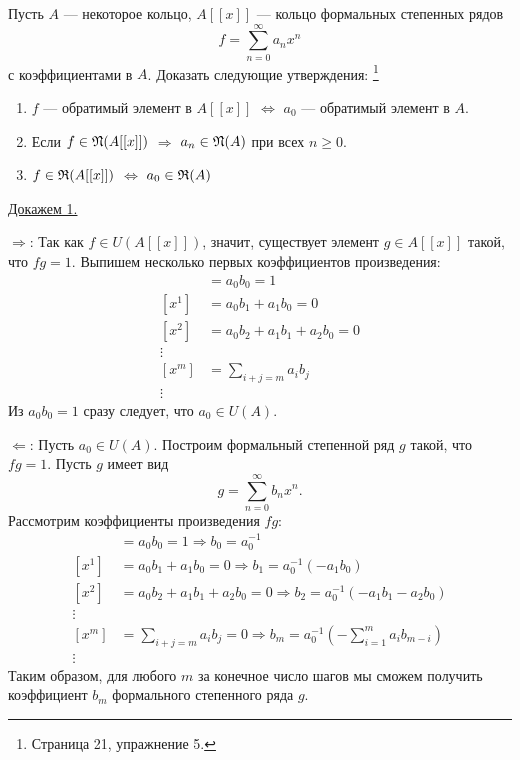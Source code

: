     \begin{Ex}
        Пусть $A$ --- некоторое кольцо, $A[[x]]$ --- кольцо формальных степенных рядов 
        $$
            f = \sum_{n=0}^\infty a_nx^n
        $$ 
        с коэффициентами в $A$. Доказать следующие 
        утверждения: \footnote{\cite{A-M} Страница 21, упражнение 5.}
        \begin{enumerate}
            \item $f$ --- обратимый элемент в $A[[x]]$ $\Leftrightarrow$ $a_0$ --- обратимый элемент в $A$.
            \item Если $f \in \mathfrak{N}(A[[x]])$ $\Rightarrow$ $a_n \in \mathfrak{N}(A)$ при всех $n \geqslant 0$.
            \item $f \in \mathfrak{R}(A[[x]])$ $\Leftrightarrow$ $a_0 \in \mathfrak{R}(A)$
        \end{enumerate}
    \end{Ex}
    \underline{Докажем 1.}
    \begin{Proof}
        
        $\Rightarrow$: Так как $f \in U(A[[x]])$, значит, существует элемент $g \in A[[x]]$ такой, что $fg = 1$. Выпишем несколько первых коэффициентов произведения:
        \begin{align*}
            [x^0] &= a_0b_0 = 1\\
            [x^1] &= a_0b_1 + a_1b_0 = 0\\
            [x^2] &= a_0b_2 + a_1b_1 + a_2b_0 = 0\\
            \vdots\\
            [x^m] &= \sum_{i + j = m}a_ib_j\\
            \vdots
        \end{align*}
        Из $a_0b_0 = 1$  сразу следует, что $a_0 \in U(A)$.

        $\Leftarrow$: Пусть $a_0 \in U(A)$. Построим формальный степенной ряд $g$ такой, что $fg = 1$. Пусть $g$ имеет вид
        $$ 
            g = \sum_{n=0}^\infty b_nx^n.
        $$
        Рассмотрим коэффициенты произведения $fg$:
        \begin{align*}
            [x^0] &= a_0b_0 = 1 \Rightarrow b_0 = a_0^{-1}\\
            [x^1] &= a_0b_1 + a_1b_0 = 0 \Rightarrow b_1 = a_0^{-1}(-a_1b_0)\\
            [x^2] &= a_0b_2 + a_1b_1 + a_2b_0 = 0 \Rightarrow b_2 = a_0^{-1}(-a_1b_1 - a_2b_0)\\
            \vdots\\
            [x^m] &= \sum_{i + j = m}a_ib_j = 0 \Rightarrow b_m = a_0^{-1}\left(-\sum_{i = 1}^{m} a_ib_{m-i}\right)\\
            \vdots
        \end{align*}
        Таким образом, для любого $m$ за конечное число шагов мы сможем получить коэффициент $b_m$ формального степенного ряда $g$. 
    \end{Proof}
